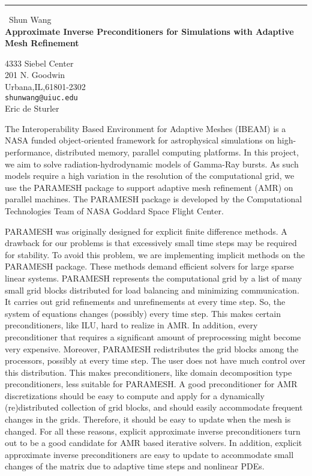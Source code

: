 \documentclass{report}
\begin{document}
\begin{center}
\rule{6in}{1pt} \
{\large Shun Wang \\
{\bf Approximate Inverse Preconditioners for Simulations with Adaptive Mesh Refinement}}

4333 Siebel Center \\ 201 N. Goodwin \\ Urbana,IL,61801-2302
\\
{\tt shunwang@uiuc.edu}\\
Eric de Sturler\end{center}

The Interoperability Based Environment for Adaptive Meshes (IBEAM) is
a NASA funded object-oriented framework for astrophysical
simulations on high-performance, distributed memory, parallel
computing platforms. In this project, we aim to solve
radiation-hydrodynamic models of Gamma-Ray bursts. As such
models require a high variation in the resolution of the computational grid,
we use the PARAMESH package to support adaptive mesh refinement (AMR) on
parallel machines. The PARAMESH package is developed by the Computational Technologies
Team of NASA Goddard Space Flight Center.

PARAMESH was originally designed for explicit finite difference
methods. A drawback for our problems is that excessively small
time steps may be required for stability. To avoid this
problem, we are implementing implicit methods on the PARAMESH package.
These methods demand efficient solvers for large sparse
linear systems. PARAMESH represents the computational grid by a list of many small grid
blocks distributed for load balancing and minimizing communication. It carries out
grid refinements and unrefinements at every time step. So, the system of
equations changes (possibly) every time step. This makes certain preconditioners, like
ILU, hard to realize in AMR. In addition, every preconditioner that requires
a significant amount of preprocessing might become very expensive.
Moreover, PARAMESH redistributes the grid blocks among the processors, possibly
at every time step. The user does not have much control over this
distribution. This makes preconditioners, like domain
decomposition type preconditioners, less suitable for PARAMESH.
A good preconditioner for AMR discretizations
should be easy to compute and apply for a dynamically (re)distributed collection
of grid blocks, and should easily accommodate frequent changes in the grids.
Therefore, it should be easy to update when the mesh is changed. For all these
reasons, explicit approximate inverse preconditioners turn out to be a good
candidate for AMR based iterative solvers. In addition, explicit approximate
inverse preconditioners are easy to update to accommodate small changes of
the matrix due to adaptive time steps and nonlinear PDEs.
\end{document}

